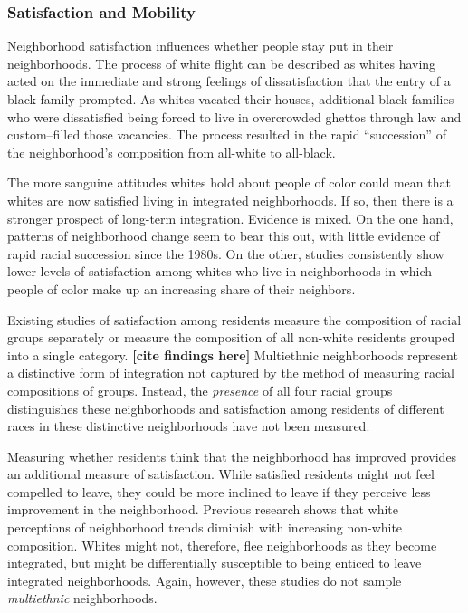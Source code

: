\documentclass[]{article}
\theoremstyle{definition}
\theoremstyle{definition}
\theoremstyle{definition}
\theoremstyle{remark}
\begin{document}
\subsubsection{Satisfaction and
Mobility}\label{satisfaction-and-mobility}

Neighborhood satisfaction influences whether people stay put in their
neighborhoods. The process of white flight can be described as whites
having acted on the immediate and strong feelings of dissatisfaction
that the entry of a black family prompted. As whites vacated their
houses, additional black families--who were dissatisfied being forced to
live in overcrowded ghettos through law and custom--filled those
vacancies. The process resulted in the rapid ``succession'' of the
neighborhood's composition from all-white to all-black.

The more sanguine attitudes whites hold about people of color could mean
that whites are now satisfied living in integrated neighborhoods. If so,
then there is a stronger prospect of long-term integration. Evidence is
mixed. On the one hand, patterns of neighborhood change seem to bear
this out, with little evidence of rapid racial succession since the
1980s. On the other, studies consistently show lower levels of
satisfaction among whites who live in neighborhoods in which people of
color make up an increasing share of their neighbors.

Existing studies of satisfaction among residents measure the composition
of racial groups separately or measure the composition of all non-white
residents grouped into a single category. \textbf{{[}cite findings
here{]}} Multiethnic neighborhoods represent a distinctive form of
integration not captured by the method of measuring racial compositions
of groups. Instead, the \emph{presence} of all four racial groups
distinguishes these neighborhoods and satisfaction among residents of
different races in these distinctive neighborhoods have not been
measured.

Measuring whether residents think that the neighborhood has improved
provides an additional measure of satisfaction. While satisfied
residents might not feel compelled to leave, they could be more inclined
to leave if they perceive less improvement in the neighborhood. Previous
research shows that white perceptions of neighborhood trends diminish
with increasing non-white composition. Whites might not, therefore, flee
neighborhoods as they become integrated, but might be differentially
susceptible to being enticed to leave integrated neighborhoods. Again,
however, these studies do not sample \emph{multiethnic} neighborhoods.
\end{document}
